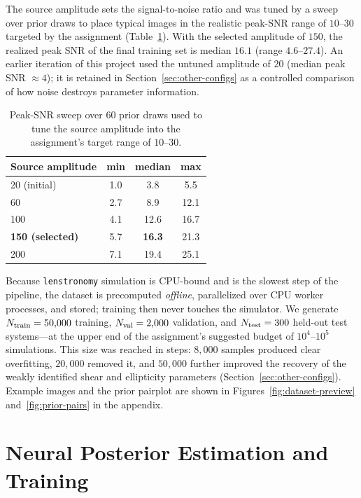 \documentclass[11pt,a4paper]{article}
\newcommand{\snrMin}{4.6}\newcommand{\snrMed}{16.1}\newcommand{\snrMax}{27.4}
\begin{document}
The source amplitude sets the signal-to-noise ratio and was tuned by a sweep over
prior draws to place typical images in the realistic peak-SNR range of $10$--$30$
targeted by the assignment (Table~\ref{tab:snr-sweep}). With the selected amplitude
of $150$, the realized peak SNR of the final training set is
median $\snrMed$ (range $\snrMin$--$\snrMax$). An earlier iteration of this project
used the untuned amplitude of $20$ (median peak SNR $\approx 4$); it is retained in
Section~\ref{sec:other-configs} as a controlled comparison of how noise destroys
parameter information.

\begin{table}[H]
\centering
\caption{Peak-SNR sweep over 60 prior draws used to tune the source amplitude into
the assignment's target range of $10$--$30$.}
\label{tab:snr-sweep}
\begin{tabular}{lccc}
\toprule
Source amplitude & min & median & max \\
\midrule
20 (initial)   & 1.0 & 3.8  & 5.5 \\
60             & 2.7 & 8.9  & 12.1 \\
100            & 4.1 & 12.6 & 16.7 \\
\textbf{150 (selected)} & 5.7 & \textbf{16.3} & 21.3 \\
200            & 7.1 & 19.4 & 25.1 \\
\bottomrule
\end{tabular}
\end{table}

Because \texttt{lenstronomy} simulation is CPU-bound and is the slowest step of the
pipeline, the dataset is precomputed \emph{offline}, parallelized over CPU worker
processes, and stored; training then never touches the simulator. We generate
$N_{\rm train} = 50{,}000$ training, $N_{\rm val} = 2{,}000$ validation, and
$N_{\rm test} = 300$ held-out test systems---at the upper end of the assignment's
suggested budget of $10^4$--$10^5$ simulations. This size was reached in steps:
$8{,}000$ samples produced clear overfitting, $20{,}000$ removed it, and
$50{,}000$ further improved the recovery of the weakly identified shear and
ellipticity parameters (Section~\ref{sec:other-configs}). Example images and the prior pairplot are shown
in Figures~\ref{fig:dataset-preview} and~\ref{fig:prior-pairs} in the appendix.

\section{Neural Posterior Estimation and Training}
\label{sec:npe}
\end{document}
